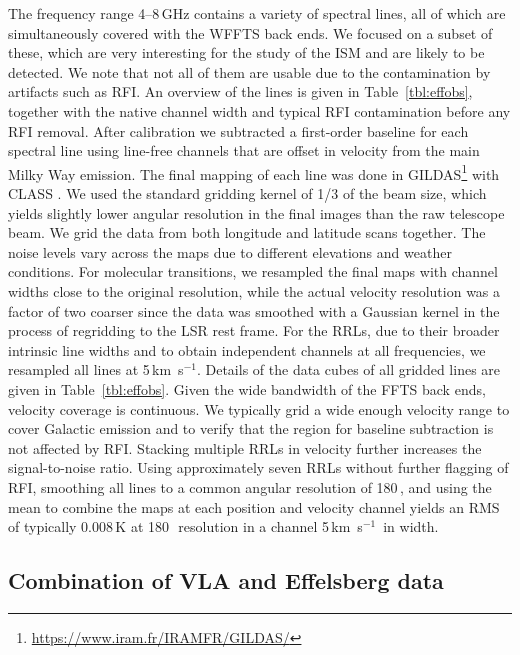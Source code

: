 \documentclass{aa}
\newcommand{\kms}{km~s$^{-1}$}
\DeclareRobustCommand{\kms}{km\,${\rm s}^{-1}$}
\begin{document}
The frequency range  4--8\,GHz contains a variety of spectral lines, all of which are simultaneously covered with the WFFTS back ends. We focused on a subset of these, which are very interesting for the study of the ISM and are likely to be detected. We note that not all of them are usable due to the contamination by artifacts such as RFI. An overview of the lines is given in Table~\ref{tbl:effobs}, together with the native channel width and typical RFI contamination before any RFI removal. After calibration we subtracted a first-order baseline for each spectral line using line-free channels that are offset in velocity from the main Milky Way emission. The final mapping of each line was done in GILDAS\footnote{\url{https://www.iram.fr/IRAMFR/GILDAS/}} with CLASS \citep{Pety:2005aa}. We used the standard gridding kernel of 1/3 of the beam size, which yields slightly lower angular resolution in the final images than the raw telescope beam. We grid the data from both longitude and latitude scans together. The noise levels vary across the maps due to different elevations and weather conditions. For molecular transitions, we resampled the final maps with channel widths close to the original resolution, while the actual velocity resolution was  a factor of two coarser since the data was smoothed with a Gaussian kernel in the process of regridding to the LSR rest frame. For the RRLs, due to their broader intrinsic line widths and to obtain independent channels at all frequencies, we resampled all lines at 5\,\kms. Details of the data cubes of all gridded lines are given in Table~\ref{tbl:effobs}. Given the wide bandwidth of the FFTS back ends, velocity coverage is continuous. We typically grid a wide enough velocity range to cover Galactic emission and to verify that the region for baseline subtraction is not affected by RFI.
Stacking multiple RRLs in velocity further increases the signal-to-noise ratio. Using approximately seven RRLs without further flagging of RFI, smoothing all lines to a common angular resolution of 180\,\arcsec, and using the mean to combine the maps at each position and velocity channel yields an RMS of typically 0.008\,K at 180\,\arcsec\ resolution in a channel  5\,\kms\ in width. 







\subsection{Combination of VLA and Effelsberg data}
\end{document}
